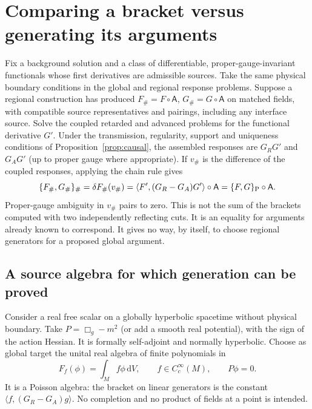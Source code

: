 \section{Comparing a bracket versus generating its arguments}

Fix a background solution and a class of differentiable, proper-gauge-invariant functionals whose first derivatives are admissible sources. Take the same physical boundary conditions in the global and regional response problems. Suppose a regional construction has produced $F_\#=F\circ\mathsf A$, $G_\#=G\circ\mathsf A$ on matched fields, with compatible source representatives and pairings, including any interface source. Solve the coupled retarded and advanced problems for the functional derivative $G'$. Under the transmission, regularity, support and uniqueness conditions of Proposition~\ref{prop:causal}, the assembled responses are $G_R G'$ and $G_A G'$ (up to proper gauge where appropriate). If $v_\#$ is the difference of the coupled responses, applying the chain rule gives
\begin{equation}
 \{F_\#,G_\#\}_{\#}
   =\delta F_\#(v_\#)
   =\langle F',(G_R-G_A)G'\rangle\circ\mathsf A
   =\{F,G\}_{\rm P}\circ\mathsf A .
 \label{eq:09-peierls}
\end{equation}
Proper-gauge ambiguity in $v_\#$ pairs to zero. This is not the sum of the brackets computed with two independently reflecting cuts. It is an equality for arguments already known to correspond. It gives no way, by itself, to choose regional generators for a proposed global argument.

\subsection{A source algebra for which generation can be proved}

Consider a real free scalar on a globally hyperbolic spacetime without physical boundary. Take $P=\Box_g-m^2$ (or add a smooth real potential), with the sign of the action Hessian. It is formally self-adjoint and normally hyperbolic. Choose as global target the unital real algebra of finite polynomials in
\[
 F_f(\phi)=\int_M f\phi\,\mathrm{d}V,\qquad f\in C_c^\infty(M),\qquad P\phi=0 .
\]
It is a Poisson algebra: the bracket on linear generators is the constant $\langle f,(G_R-G_A)g\rangle$. No completion and no product of fields at a point is intended.

